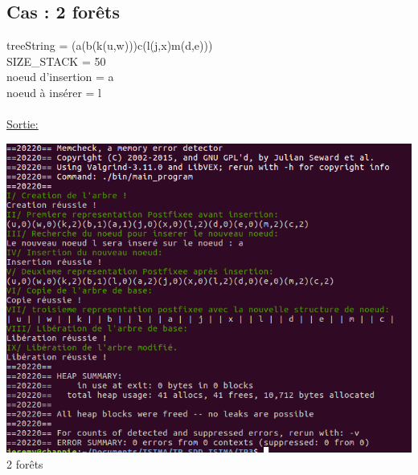 \documentclass[a4paper]{article}
\begin{document}
\subsection{Cas : 2 forêts}
treeString = (a(b(k(u,w)))c(l(j,x)m(d,e)))
\\ 
SIZE\_STACK = 50
\\
noeud d'insertion = a
\\
noeud à insérer = l
\\
\\
\underline{Sortie: }
\begin{center}
\includegraphics[scale=0.6]{2foret.png}
\\
2 forêts
\end{center}
\end{document}
